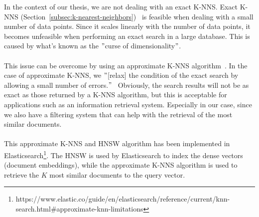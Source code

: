 \noindent In the context of our thesis, we are not dealing with an exact K-NNS\@.
Exact K-NNS (Section~\ref{subsec:k-nearest-neighbors})~\cite{navarro_searching_2002, tellez_singleton_2016} is feasible when dealing with a small number of data points.
Since it scales linearly with the number of data points, it becomes unfeasible when performing an exact search in a large database.
This is caused by what's known as the \("\)curse of dimensionality\("\). \\ \\
This issue can be overcome by using an approximate K-NNS algorithm~\cite{muja_scalable_2014, houle_rank-based_2015}.
In the case of approximate K-NNS, we \("\)[relax] the condition of the exact search by allowing a small number of errors.\("\)~\cite{malkov_efficient_2020}
Obviously, the search results will not be as exact as those returned by a K-NNS algorithm, but this is acceptable for applications such as an information retrieval system.
Especially in our case, since we also have a filtering system that can help with the retrieval of the most similar documents. \\ \\
This approximate K-NNS and HNSW algorithm has been implemented in Elasticsearch\footnote{https://www.elastic.co/guide/en/elasticsearch/reference/current/knn-search.html\#approximate-knn-limitations}.
The HNSW is used by Elasticsearch to index the dense vectors (document embeddings), while the approximate K-NNS algorithm is used to retrieve the $K$ most similar documents to the query vector.
